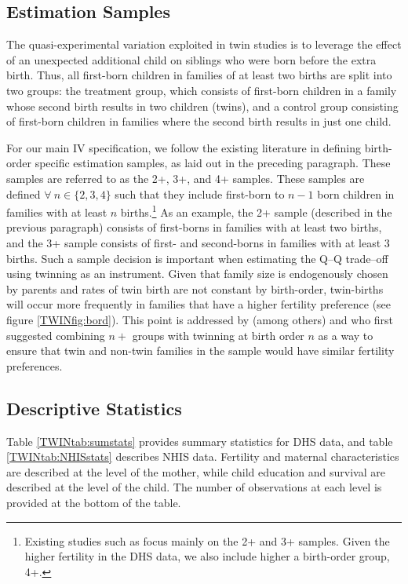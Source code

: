 \documentclass[subeqn]{article}
\begin{document}
\begin{spacing}{1.4}
\subsection{Estimation Samples}                    \label{TWINsscn:samples}
The quasi-experimental variation exploited in twin studies is to leverage the 
effect of an unexpected additional child on siblings who were born before the 
extra birth.  Thus, all first-born children in families of at least two births
are split into two groups: the treatment group, which consists of first-born
children in a family whose second birth results in two children (twins), and a
control group consisting of first-born children in families where the second
birth results in just one child.

For our main IV specification, we follow the existing literature in defining
birth-order specific estimation samples, as laid out in the preceding 
paragraph. These samples are referred to as the 2+, 3+, and 4+ samples. These 
samples are defined $\forall\ n \in \{2, 3, 4\}$ such that they include 
first-born to $n-1$ born children in families with at least $n$ births.\footnote{
Existing studies such as \citet{Angristetal2010} focus mainly on the 2+ and 3+ 
samples. Given the higher fertility in the DHS data, we also include higher a
birth-order group, 4+.} As an example, the 2+ sample (described in the previous
paragraph) consists of first-borns in families with at least two births, and the 
3+ sample consists of first- and second-borns in families with at least 3 births.
Such a sample decision is important when estimating the Q--Q trade--off using 
twinning as an instrument. Given that family size is endogenously chosen by 
parents and rates of twin birth are not constant by birth-order, twin-births will 
occur more frequently in families that have a higher fertility preference (see
figure \ref{TWINfig:bord}). This point is addressed by (among others) 
\citet{RosenzweigWolpin1980} and \citet{Blacketal2005} who first suggested 
combining $n+$ groups with twinning at birth order $n$ as a way to ensure that 
twin and non-twin families in the sample would have similar fertility 
preferences.

\subsection{Descriptive Statistics}                \label{TWINsscn:descriptives}
Table \ref{TWINtab:sumstats} provides summary statistics for DHS data, and table
\ref{TWINtab:NHISstats} describes NHIS data.  Fertility and maternal 
characteristics are described at the level of the mother, while child education 
and survival are described at the level of the child. The number of observations 
at each level is provided at the bottom of the table.


\end{spacing}
\end{document}
